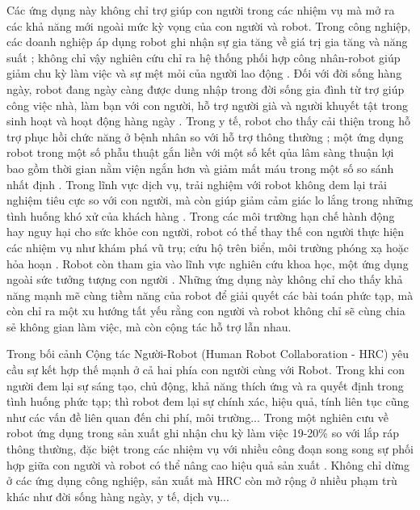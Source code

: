 Các ứng dụng này không chỉ trợ giúp con người trong các nhiệm vụ mà mở ra các khả năng mới ngoài mức kỳ vọng của con người và robot. Trong công nghiệp, các doanh nghiệp áp dụng robot ghi nhận sự gia tăng về giá trị gia tăng và năng suất \cite{acemoglu2020cwithrobot}; không chỉ vậy nghiên cứu chỉ ra hệ thống phối hợp công nhân-robot giúp giảm chu kỳ làm việc và sự mệt mỏi của người lao động \cite{montini2024indust}. Đối với đời sống hàng ngày, robot đang ngày càng được dung nhập trong đời sống gia đình từ trợ giúp công việc nhà, làm bạn với con người, hỗ trợ người già và người khuyết tật trong sinh hoạt và hoạt động hàng ngày \cite{jan2024common, claire2025preserv, hai2023adative, ahmed2024hrcompanion, amal2024physically}. Trong y tế, robot cho thấy cải thiện trong hỗ trợ phục hồi chức năng ở bệnh nhân so với hỗ trợ thông thường \cite{tingting2024assistedpatients}; một ứng dụng robot trong một số phẫu thuật gắn liền với một số kết qủa lâm sàng thuận lợi bao gồm thời gian nằm viện ngắn hơn và giảm mất máu trong một số so sánh nhất định \cite{ricciardi2025daVinci}. Trong lĩnh vực dịch vụ, trải nghiệm với robot không dem lại trải nghiệm tiêu cực so với con người, mà còn giúp giảm cảm giác lo lắng trong những tình huống khó xử của khách hàng \cite{alex2025service, valen2024uncomserv}. Trong các môi trường hạn chế hành động hay nguy hại cho sức khỏe con người, robot có thể thay thế con người thực hiện các nhiệm vụ như khám phá vũ trụ; cứu hộ trên biển, môi trường phóng xạ hoặc hỏa hoạn \cite{nasa2023autonav, nasa2024mars, toma2018rescue, fuku2024fukushima, michiel2023drone}. Robot còn tham gia vào lĩnh vực nghiên cứu khoa học, một ứng dụng ngoài sức tưởng tượng con người \cite{szy2023lab}. Những ứng dụng này không chỉ cho thấy khả năng mạnh mẽ cùng tiềm năng của robot để giải quyết các bài toán phức tạp, mà còn chỉ ra một xu hướng tất yếu rằng con người và robot không chỉ sẽ cùng chia sẻ không gian làm việc, mà còn cộng tác hỗ trợ lẫn nhau.

Trong bối cảnh Cộng tác Người-Robot (Human Robot Collaboration - HRC) yêu cầu sự kết hợp thế mạnh ở cả hai phía con người cùng với Robot. Trong khi con người đem lại sự sáng tạo, chủ động, khả năng thích ứng và ra quyết định trong tình huống phức tạp; thì robot đem lại sự chính xác, hiệu quả, tính liên tục cũng như các vấn đề liên quan đến chi phí, môi trường... Trong một nghiên cưu về robot ứng dụng trong sản xuất ghi nhận chu kỳ làm việc 19-20\% so với lắp ráp thông thường, đặc biệt trong các nhiệm vụ với nhiều công đoạn song song sự phối hợp giữa con người và robot có thể nâng cao hiệu quả sản xuất \cite{pet}. 
Không chỉ dừng ở các ứng dụng công nghiệp, sản xuất mà HRC còn mở rộng ở nhiều phạm trù khác như đời sống hàng ngày, y tế, dịch vụ...

